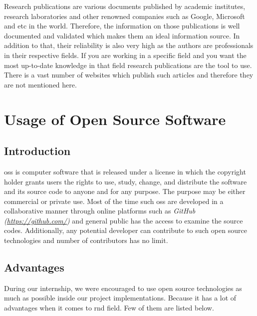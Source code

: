 \documentclass[a4paper,12pt]{report}%
\begin{document}
Research publications are various documents published by academic institutes, research laboratories and other renowned companies such as Google, Microsoft and etc in the world. Therefore, the information on those publications is well documented and validated which makes them an ideal information source. In addition to that, their reliability is also very high as the authors are professionals in their respective fields. If you are working in a specific field and you want the most up-to-date knowledge in that field research publications are the tool to use. There is a vast number of websites which publish such articles and therefore they are not mentioned here.




\section{Usage of Open Source Software}

\subsection{Introduction}

\Ac{oss} is computer software that is released under a license in which the copyright holder grants users the rights to use, study, change, and distribute the software and its source code to anyone and for any purpose\cite{oss}. The purpose may be either commercial or private use. Most of the time such \ac{oss} are developed in a collaborative manner through  online platforms such as \textit{GitHub (\url{https://github.com/})} and general public has the access to examine the source codes. Additionally, any potential developer can contribute to such open source technologies and number of contributors has no limit.


\subsection{Advantages}

During our internship, we were encouraged  to use open source technologies as much as possible inside our project implementations. Because it has a lot of advantages when it comes to \ac{rnd} field. Few of them are listed below.
\end{document}

